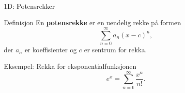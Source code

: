 \blueheader
\begin{frame}{1D: Potensrekker}
\begin{blue*}{Definisjon}
En \textbf{potensrekke} er en uendelig rekke på formen
\[
\sum_{n=0}^{\infty} a_n (x-c)^n,
\]
der $a_n$ er koeffisienter og $c$ er sentrum for rekka.
\end{blue*}
\begin{green*}{Eksempel: Rekka for eksponentialfunksjonen}
\[
e^x = \sum_{n=0}^{\infty} \frac{x^n}{n!}.
\]
   
\end{green*}


\end{frame}























